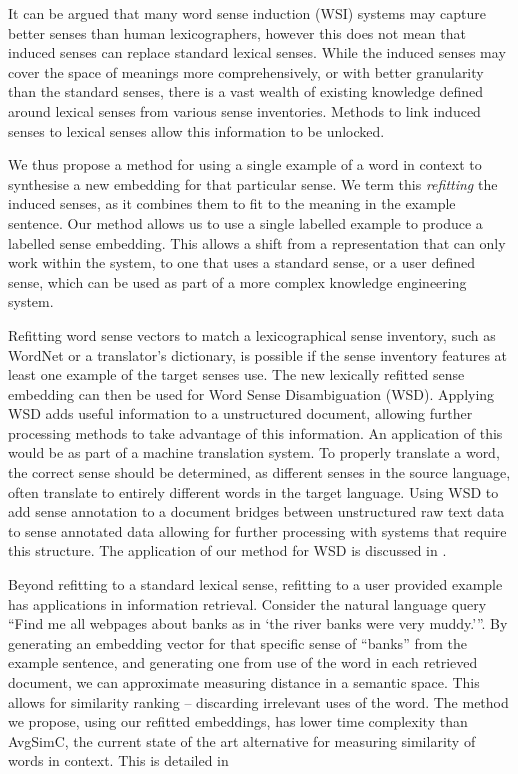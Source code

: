 \documentclass{sig-alternate}
\begin{document}
It can be argued that many word sense induction (WSI) systems may capture better senses than human lexicographers, however this does not mean that induced senses can replace standard lexical senses. While the induced senses may cover the space of meanings more comprehensively, or with better granularity than the standard senses, there is a vast wealth of existing knowledge defined around lexical senses from various sense inventories. Methods to link induced senses to lexical senses allow this information to be unlocked.


We thus propose a method for using a single example of a word in context to synthesise a new embedding for that particular sense. We term this \emph{refitting} the induced senses, as it combines them to fit to the meaning in the example sentence. Our method allows us to use a single labelled example to produce a labelled sense embedding. This allows a shift from a representation that can only work within the system, to one that uses a standard sense, or a user defined sense, which can be used as part of a more complex knowledge engineering system. 

Refitting word sense vectors to match a lexicographical sense inventory, such as WordNet or a translator's dictionary, is possible if the sense inventory features at least one example of the target senses use. The new lexically refitted sense embedding can then be used for Word Sense Disambiguation (WSD). Applying WSD adds useful information to a unstructured document, allowing further processing methods to take advantage of this information. An application of this would be as part of a machine translation system. To properly translate a word, the correct sense should be determined, as different senses in the source language, often translate to entirely different words in the target language. Using WSD to add sense annotation to a document bridges between unstructured raw text data to sense annotated data allowing for further processing with systems that require this structure. The application of our method for WSD is discussed in .

Beyond refitting to a standard lexical sense, refitting to a user provided example has applications in information retrieval. Consider the natural language query \enquote{Find me all webpages about banks as in \enquote{the river banks were very muddy.}}. By generating an embedding vector for that specific sense of ``banks'' from the example sentence, and generating one from use of the word in each retrieved document, we can approximate measuring distance in a semantic space. This allows for similarity ranking -- discarding irrelevant uses of the word. The method we propose, using our refitted embeddings, has lower time complexity than AvgSimC, the current state of the art alternative for measuring similarity of words in context. This is detailed in 
\end{document}
